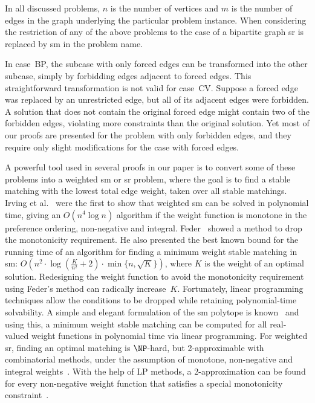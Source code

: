 \documentclass[preprint,12pt]{elsarticle}
\begin{document}
In all discussed problems, $n$ is the number of vertices and $m$ is the number of edges in the graph underlying the particular problem instance. When considering the restriction of any of the above problems to the case of a bipartite graph {\sc sr} is replaced by {\sc sm} in the problem name.

In case~BP, the subcase with only forced edges can be transformed into the other subcase, simply by forbidding edges adjacent to forced edges. This straightforward transformation is not valid for case~CV. Suppose a forced edge was replaced by an unrestricted edge, but all of its adjacent edges were forbidden. A solution that does not contain the original forced edge might contain two of the forbidden edges, violating more constraints than the original solution. Yet most of our proofs are presented for the problem with only forbidden edges, and they require only slight modifications for the case with forced edges.

A powerful tool used in several proofs in our paper is to convert some of these problems into a weighted {\sc sm} or {\sc sr} problem, where the goal is to find a stable matching with the lowest total edge weight, taken over all stable matchings. Irving et al.~\cite{ILG87} were the first to show that weighted {\sc sm} can be solved in polynomial time, giving an $O(n^4 \log n)$ algorithm if the weight function is monotone in the preference ordering, non-negative and integral. Feder~\cite{Fed92,Fed94} showed a method to drop the monotonicity requirement. He also presented the best known bound for the running time of an algorithm for finding a minimum weight stable matching in {\sc sm}: $O(n^{2} \cdot \log({\frac{K}{n^2}}+2)\cdot \min{\{n, \sqrt{K}\}})$, where $K$ is the weight of an optimal solution. Redesigning the weight function to avoid the monotonicity requirement using Feder's method can radically increase~$K$. Fortunately, linear programming techniques allow the conditions to be dropped while retaining polynomial-time solvability. A simple and elegant formulation of the {\sc sm} polytope is known~\cite{Rot92} and using this, a minimum weight stable matching can be computed for all real-valued weight functions in polynomial time via linear programming. For weighted {\sc sr}, finding an optimal matching is $\NP$-hard, but 2-approximable with combinatorial methods, under the assumption of monotone, non-negative and integral weights~\cite{Fed92}. With the help of LP methods, a 2-approximation can be found for every non-negative weight function that satisfies a special monotonicity constraint~\cite{TS97,TS98}.
\end{document}
